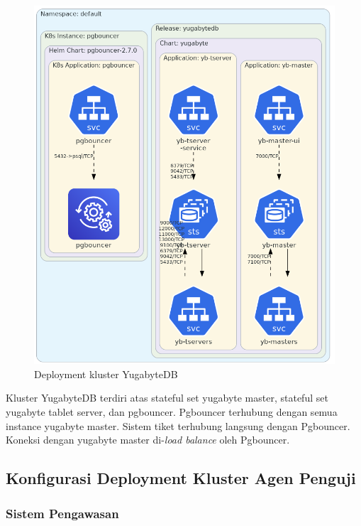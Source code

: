 \begin{figure}[htbp]
    \centering
    \includegraphics[width=1\textwidth]{resources/chapter-4/yugabyte.png}
    \caption{Deployment kluster YugabyteDB}
    \label{fig:deployment-yugabyte}
\end{figure}

Kluster YugabyteDB terdiri atas stateful set yugabyte master, stateful set yugabyte tablet server, dan pgbouncer. Pgbouncer terhubung dengan semua instance yugabyte master. Sistem tiket terhubung langsung dengan Pgbouncer. Koneksi dengan yugabyte master di-\textit{load balance} oleh Pgbouncer.

\pagebreak

\subsection{Konfigurasi Deployment Kluster Agen Penguji}

\subsubsection{Sistem Pengawasan}

